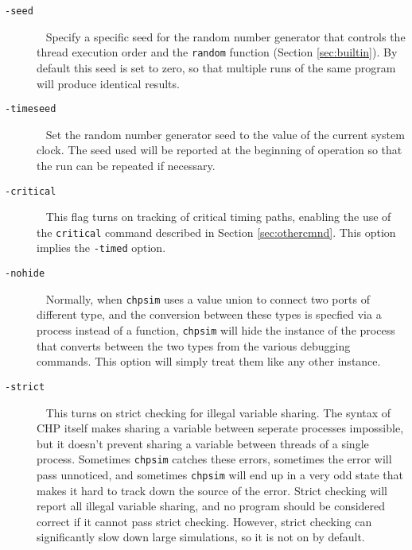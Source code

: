 \begin{description}
\item[{\tt{}-seed}] \ \linebreak
Specify a specific seed for the random number generator that controls the
thread execution order and the \verb|random| function
(Section \ref{sec:builtin}).  By default this seed is set to zero, so that
multiple runs of the same program will produce identical results.

\item[{\tt{}-timeseed}] \ \linebreak
Set the random number generator seed to the value of the current system clock.
The seed used will be reported at the beginning of operation so that the run
can be repeated if necessary.

\item[{\tt{}-critical}] \ \linebreak
This flag turns on tracking of critical timing paths, enabling the use of the
\verb|critical| command described in Section \ref{sec:othercmnd}.  This option implies
the \verb|-timed| option.

\item[{\tt{}-nohide}] \ \linebreak
Normally, when \verb|chpsim| uses a value union to connect two ports of
different type, and the conversion between these types is specfied via a
process instead of a function, \verb|chpsim| will hide the instance of
the process that converts between the two types from the various debugging
commands.  This option will simply treat them like any other instance.

\item[{\tt{}-strict}] \ \linebreak
This turns on strict checking for illegal variable sharing.  The syntax of
CHP itself makes sharing a variable between seperate processes impossible,
but it doesn't prevent sharing a variable between threads of a single process.
Sometimes \verb|chpsim| catches these errors, sometimes the error will pass
unnoticed, and sometimes \verb|chpsim| will end up in a very odd state that
makes it hard to track down the source of the error.  Strict checking will
report all illegal variable sharing, and no program should be considered
correct if it cannot pass strict checking.  However, strict checking can
significantly slow down large simulations, so it is not on by default.
\end{description}


